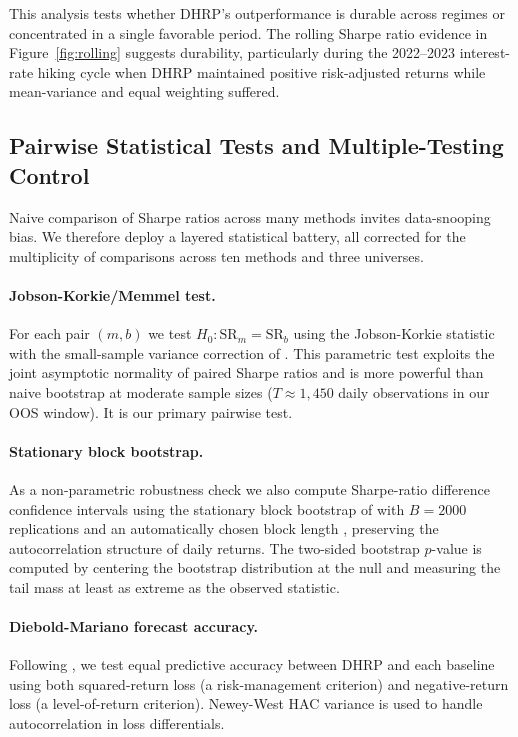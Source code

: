 \documentclass{article}
\begin{document}
This analysis tests whether DHRP's outperformance is durable across regimes or concentrated in a single favorable period. The rolling Sharpe ratio evidence in Figure~\ref{fig:rolling} suggests durability, particularly during the 2022--2023 interest-rate hiking cycle when DHRP maintained positive risk-adjusted returns while mean-variance and equal weighting suffered.

\subsection{Pairwise Statistical Tests and Multiple-Testing Control}

Naive comparison of Sharpe ratios across many methods invites data-snooping bias. We therefore deploy a layered statistical battery, all corrected for the multiplicity of comparisons across ten methods and three universes.

\paragraph{Jobson-Korkie/Memmel test.} For each pair $(m, b)$ we test $H_0: \text{SR}_m = \text{SR}_b$ using the Jobson-Korkie statistic \citep{JobsonKorkie1981} with the small-sample variance correction of \citet{Memmel2003}. This parametric test exploits the joint asymptotic normality of paired Sharpe ratios and is more powerful than naive bootstrap at moderate sample sizes ($T \approx 1{,}450$ daily observations in our OOS window). It is our primary pairwise test.

\paragraph{Stationary block bootstrap.} As a non-parametric robustness check we also compute Sharpe-ratio difference confidence intervals using the stationary block bootstrap of \citet{PolitisRomano1994} with $B = 2000$ replications and an automatically chosen block length \citep{PolitisWhite2004}, preserving the autocorrelation structure of daily returns. The two-sided bootstrap $p$-value is computed by centering the bootstrap distribution at the null and measuring the tail mass at least as extreme as the observed statistic.

\paragraph{Diebold-Mariano forecast accuracy.} Following \citet{DieboldMariano1995}, we test equal predictive accuracy between DHRP and each baseline using both squared-return loss (a risk-management criterion) and negative-return loss (a level-of-return criterion). Newey-West HAC variance is used to handle autocorrelation in loss differentials.
\end{document}
